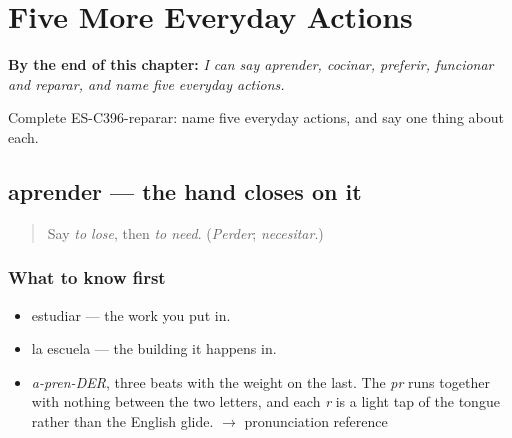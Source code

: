 
\chapter{Five More Everyday Actions}
\label{ch:aprender-y-cocinar}

\begin{chapteropening}
\textbf{By the end of this chapter:} \emph{I can say aprender, cocinar, preferir, funcionar and reparar, and name five everyday actions.}

Complete ES-C396-reparar: name five everyday actions, and say one thing about each.
\end{chapteropening}

\section[aprender]{aprender — the hand closes on it}

\label{lesson:ES-C396-aprender}



\begin{quote}
Say \emph{to lose}, then \emph{to need}. (\emph{Perder}; \emph{necesitar}.)
\end{quote}

\subsection*{What to know first}
\begin{itemize}
\raggedright
  \item estudiar — the work you put in.
  \item la escuela — the building it happens in.
\end{itemize}

\begin{sounds}
\begin{itemize}
\raggedright
  \item \emph{a-pren-DER}, three beats with the weight on the last. The \emph{pr} runs together with nothing between the two letters, and each \emph{r} is a light tap of the tongue rather than the English glide. $\to$ pronunciation reference
\end{itemize}
\end{sounds}

